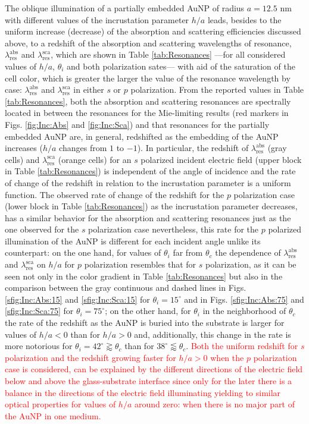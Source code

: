 The oblique illumination of a partially embedded AuNP of radius $a=12.5$ nm with different values of the incrustation parameter $h/a$ leads, besides to the uniform increase (decrease) of the absorption and scattering efficiencies discussed above, to a redshift of the absorption and scattering wavelengths of resonance, $\lambda_\text{res}^\text{abs}$ and $\lambda_\text{res}^\text{sca}$, which are shown in Table \ref{tab:Resonances} ---for all considered values of $h/a$, $\theta_i$ and both polarization sates--- with aid of the saturation of the cell color, which is greater the larger the value of the resonance wavelength by case: $\lambda_\text{res}^\text{abs}$ and $\lambda_\text{res}^\text{sca}$ in either $s$ or $p$ polarization. From the reported values in Table \ref{tab:Resonances}, both the absorption and scattering resonances are spectrally located in between the resonances for the Mie-limiting results (red markers in Figs. \ref{fig:Inc:Abs} and \ref{fig:Inc:Sca}) and that resonances for the partially embedded AuNP are, in general, redshifted as the embedding of the AuNP increases ($h/a$ changes from $1$ to $-1$). In particular, the redshift of $\lambda_\text{res}^\text{abs}$ (gray cells) and $\lambda_\text{res}^\text{sca}$ (orange cells) for an $s$ polarized incident electric field (upper block in Table \ref{tab:Resonances}) is independent of the angle of incidence and the rate of change of the redshift in relation to the incrustation parameter is a uniform function. The observed rate of change of the redshift for the $p$ polarization case (lower block in Table \ref{tab:Resonances}) as the incrustation parameter decreases, has a similar behavior for the absorption and scattering resonances just as the one observed for the $s$ polarization case nevertheless, this rate for the $p$ polarized illumination of the AuNP is different for each incident angle unlike its counterpart: on the one hand, for values of $\theta_i$ far from $\theta_c$ the dependence of  $\lambda_\text{res}^\text{abs}$ and $\lambda_\text{res}^\text{sca}$ on $h/a$ for $p$ polarization resembles that for $s$ polarization, as it can be seen not only in the color gradient in Table \ref{tab:Resonances} but also in the comparison between the gray continuous and dashed lines in Figs. \ref{sfig:Inc:Abs:15} and \ref{sfig:Inc:Sca:15} for $\theta_i = 15^\circ$ and in Figs. \ref{sfig:Inc:Abs:75} and \ref{sfig:Inc:Sca:75} for $\theta_i = 75^\circ$; on the other hand, for $\theta_i$ in the neighborhood of $\theta_c$ the rate of the redshift as the AuNP is buried into the substrate is larger for values of $h/a<0$ than for $h/a>0$ and, additionally, this change in the rate is more notorious for $\theta_i = 42^\circ\gtrapprox \theta_c$ than for $38^\circ\lessapprox \theta_c$. \textcolor{red}{Both the uniform redshift for $s$ polarization and the redshift growing faster for $h/a>0$ when the $p$ polarization case is considered, can be explained by the different directions of the electric field below and above the glass-substrate interface since only for the later there is a balance in the directions of the electric field illuminating yielding to similar optical properties for values of $h/a$  around zero: when there is no major part of the AuNP in one medium.}

